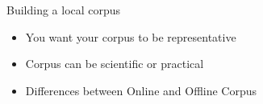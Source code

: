 \documentclass{beamer}
\begin{document}
\begin{frame}{Building a local corpus}
\begin{itemize}
\item You want your corpus to be representative
\item Corpus can be scientific or practical
\item Differences between Online and Offline Corpus

\begin{table}
\centering
\caption{Pros and Cons of Using a Local Corpus}
\label{pros_cons}
\end{table}



\end{itemize}


\end{frame}
\end{document}
